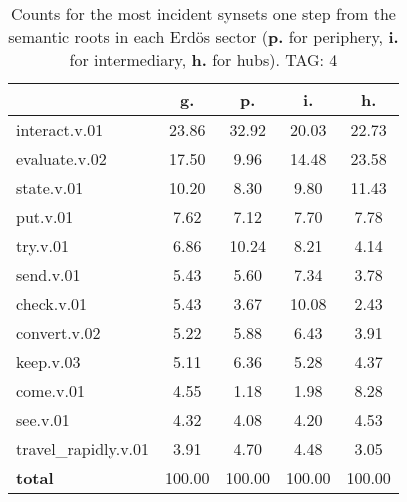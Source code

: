 \begin{table}[h!]
\begin{center}
\begin{tabular}{| l | c | c | c | c |}\hline
 & g. & p. & i. & h. \\\hline
interact.v.01 & 23.86  & 32.92  & 20.03  & 22.73 \\\hline
evaluate.v.02 & 17.50  & 9.96  & 14.48  & 23.58 \\\hline
state.v.01 & 10.20  & 8.30  & 9.80  & 11.43 \\\hline
put.v.01 & 7.62  & 7.12  & 7.70  & 7.78 \\\hline
try.v.01 & 6.86  & 10.24  & 8.21  & 4.14 \\\hline
send.v.01 & 5.43  & 5.60  & 7.34  & 3.78 \\\hline
check.v.01 & 5.43  & 3.67  & 10.08  & 2.43 \\\hline
convert.v.02 & 5.22  & 5.88  & 6.43  & 3.91 \\\hline
keep.v.03 & 5.11  & 6.36  & 5.28  & 4.37 \\\hline
come.v.01 & 4.55  & 1.18  & 1.98  & 8.28 \\\hline
see.v.01 & 4.32  & 4.08  & 4.20  & 4.53 \\\hline
travel\_rapidly.v.01 & 3.91  & 4.70  & 4.48  & 3.05 \\\hline
{{\bf total}} & 100.00  & 100.00  & 100.00  & 100.00 \\\hline
\end{tabular}
\caption{Counts for the most incident synsets one step from the semantic roots in each Erd\"os sector ({\bf p.} for periphery, {\bf i.} for intermediary, {\bf h.} for hubs). TAG: 4}
\end{center}
\end{table}